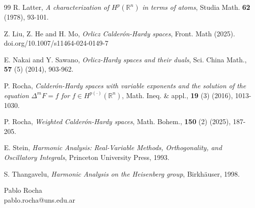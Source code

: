 \documentclass[reqno,10pt]{article}
\theoremstyle{definition}
\numberwithin{equation}{section}
\numberwithin{theorem}{section}
\begin{document}
\begin{thebibliography}{99}
 R. Latter, \textit{A characterization of $H^{p}(\mathbb{R}^{n})$ in terms of atoms}, Studia Math. \textbf{62} (1978), 93-101. 

 Z. Liu, Z. He and H. Mo, \textit{Orlicz Calder\'on-Hardy spaces}, Front. Math (2025). doi.org/10.1007/s11464-024-0149-7

 E. Nakai and Y. Sawano, \textit{Orlicz-Hardy spaces and their duals}, Sci. China Math., \textbf{57} (5) (2014), 903-962.

 P. Rocha, \textit{Calder\'on-Hardy spaces with variable exponents and the solution of the equation $\Delta^{m}F=f$ for
$f \in H^{p(\cdot)}(\mathbb{R}^{n})$}, Math. Ineq. \& appl., \textbf{19} (3) (2016), 1013-1030.

 P. Rocha, \textit{Weighted Calder\'on-Hardy spaces}, Math. Bohem., \textbf{150} (2) (2025), 187-205.

 E. Stein, \textit{Harmonic Analysis: Real-Variable Methods, Orthogonality, and Oscillatory Integrals}, Princeton University Press, 1993.

 S. Thangavelu, \textit{Harmonic Analysis on the Heisenberg group}, Birkh\"auser, 1998.

\end{thebibliography} \bigskip


\noindent Pablo Rocha \\
pablo.rocha@uns.edu.ar \bigskip

\bigskip
\end{document}
